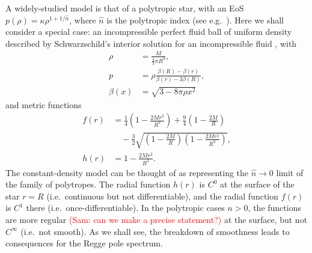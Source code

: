 \documentclass[aps,prd,longbibliography,reprint,twocolumn,amsmath,amssymb,amsfonts,showpacs,superscriptaddress]{revtex4-1}%
\newcommand{\nn}{\nonumber}
\newcommand{\sam}[1]{\textcolor{red}{(Sam: #1)}}
\begin{document}
A widely-studied model is that of a polytropic star, with an EoS $p(\rho) = \kappa \rho^{1+1/\hat{n}}$, where $\hat{n}$ is the polytropic index (see e.g.~\cite{Stratton:2019deq}). Here we shall consider a special case: an incompressible perfect fluid ball of uniform density described by Schwarzschild's interior solution for an incompressible fluid \cite{Shapiro1983}, with
\begin{subequations}
\begin{align}
\rho &= \frac{M}{\frac{4}{3} \pi R^3} , \\
p &= \rho \frac{\beta(R) - \beta(r)}{ \beta(r) - 3 \beta(R)} , \\
\beta(x) &= \sqrt{3 - 8 \pi \rho x^2}
\end{align}
\end{subequations}
and metric functions
%
\begin{subequations}\label{Interior_Solution}
\begin{align}\label{Interior_Solution_f}
 f(r) &= \frac{1}{4}\left(1-\frac{2 M r^2}{R^3}\right)+\frac{9}{4}\left(1-\frac{2M}{R}\right) \nn \\
       & \quad -\frac{3}{2} \sqrt{\left(1-\frac{2M}{R}\right)\left(1-\frac{2 M r^2}{R^3}\right)}, \\
 h(r) &= 1-\frac{2 M r^2}{R^3} . \label{Interior_Solution_h}
\end{align}
\end{subequations}
The constant-density model can be thought of as representing the $\hat{n} \rightarrow 0$ limit of the family of polytropes.
The radial function $h(r)$ is $C^0$ at the surface of the star $r=R$ (i.e.~continuous but not differentiable), and the radial function $f(r)$ is $C^1$ there (i.e.~once-differentiable). In the polytropic cases $n > 0$, the functions are more regular \sam{can we make a precise statement?} at the surface, but not $C^\infty$ (i.e.~not smooth). As we shall see, the breakdown of smoothness leads to consequences for the Regge pole spectrum.
\end{document}

